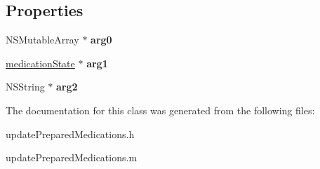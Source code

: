 \subsection*{Properties}
\begin{DoxyCompactItemize}
\item 
\hypertarget{interfaceupdate_prepared_medications_abe359b670a78f9575778d89413a3db62}{}N\+S\+Mutable\+Array $\ast$ {\bfseries arg0}\label{interfaceupdate_prepared_medications_abe359b670a78f9575778d89413a3db62}

\item 
\hypertarget{interfaceupdate_prepared_medications_af823dbf517142ed69f3ec81422a47acb}{}\hyperlink{interfacemedication_state}{medication\+State} $\ast$ {\bfseries arg1}\label{interfaceupdate_prepared_medications_af823dbf517142ed69f3ec81422a47acb}

\item 
\hypertarget{interfaceupdate_prepared_medications_a241c7102956476e3e421fb34c4c85bbc}{}N\+S\+String $\ast$ {\bfseries arg2}\label{interfaceupdate_prepared_medications_a241c7102956476e3e421fb34c4c85bbc}

\end{DoxyCompactItemize}


The documentation for this class was generated from the following files\+:\begin{DoxyCompactItemize}
\item 
update\+Prepared\+Medications.\+h\item 
update\+Prepared\+Medications.\+m\end{DoxyCompactItemize}
